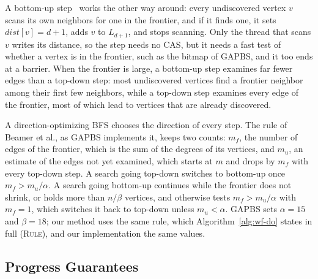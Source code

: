 A bottom-up step~\cite{beamer_dobfs} works the other way around: every undiscovered vertex $v$ scans its own neighbors for one in the frontier, and if it finds one, it sets $\mathit{dist}[v] = d+1$, adds $v$ to $L_{d+1}$, and stops scanning. Only the thread that scans $v$ writes its distance, so the step needs no CAS, but it needs a fast test of whether a vertex is in the frontier, such as the bitmap of GAPBS, and it too ends at a barrier. When the frontier is large, a bottom-up step examines far fewer edges than a top-down step: most undiscovered vertices find a frontier neighbor among their first few neighbors, while a top-down step examines every edge of the frontier, most of which lead to vertices that are already discovered.

A direction-optimizing BFS chooses the direction of every step. The rule of Beamer et al., as GAPBS implements it, keeps two counts: $m_f$, the number of edges of the frontier, which is the sum of the degrees of its vertices, and $m_u$, an estimate of the edges not yet examined, which starts at $m$ and drops by $m_f$ with every top-down step. A search going top-down switches to bottom-up once $m_f > m_u / \alpha$. A search going bottom-up continues while the frontier does not shrink, or holds more than $n / \beta$ vertices, and otherwise tests $m_f > m_u / \alpha$ with $m_f = 1$, which switches it back to top-down unless $m_u < \alpha$. GAPBS sets $\alpha = 15$ and $\beta = 18$; our method uses the same rule, which Algorithm~\ref{alg:wf-do} states in full (\textsc{Rule}), and our implementation the same values.

\subsection{Progress Guarantees}
\label{sec:bg-progress}

